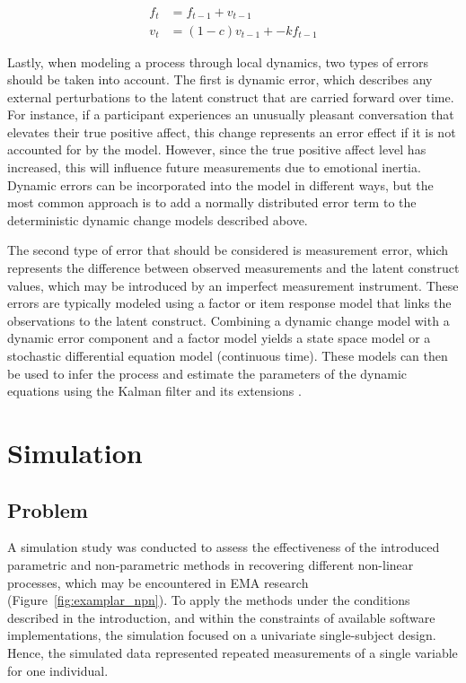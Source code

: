 \documentclass[man, floatsintext]{apa7}
\begin{document}
\begin{equation}
  \begin{aligned}
    f_{t} & = f_{t-1} + v_{t-1}        \\
    v_{t} & = (1-c)v_{t-1} + -kf_{t-1}
  \end{aligned}
\end{equation}

Lastly, when modeling a process through local dynamics, two types of errors
should be taken into account. The first is dynamic error, which describes any
external perturbations
to the latent construct that are carried forward over time. For instance,
if a participant experiences an unusually pleasant conversation that elevates
their true positive affect, this change represents an error effect if it is
not accounted for by the model. However, since the true
positive affect level has increased, this will influence future measurements
due to emotional inertia. Dynamic errors can be incorporated into the model in
different ways, but the most common approach is to add a normally
distributed error term to the deterministic dynamic change models described
above.

The second type of error that should be considered is measurement error,
which represents the difference between observed measurements and the
latent construct values, which may be introduced by an imperfect measurement
instrument. These errors are typically
modeled using a factor or item response model that links the observations to
the latent construct. Combining a dynamic change model with a dynamic error
component and a factor model yields a state space model \parencite[discrete
  time;][]{durbin_time_2012} or a stochastic differential equation model
(continuous time). These models can then be used to infer the process and
estimate the parameters of the dynamic equations using the Kalman filter and
its extensions \parencite{chow_unscented_2007}.

\section{Simulation}

\subsection{Problem}

A simulation study was conducted to assess the effectiveness of the introduced
parametric and non-parametric methods in recovering different
non-linear processes, which may be encountered in EMA research
(Figure~\ref{fig:examplar_npn}).
To apply the methods under the conditions described in the
introduction,
and within the constraints of available software implementations,
the simulation focused on
a univariate single-subject design. Hence, the simulated data represented
repeated measurements of a single variable for one individual.
\end{document}
